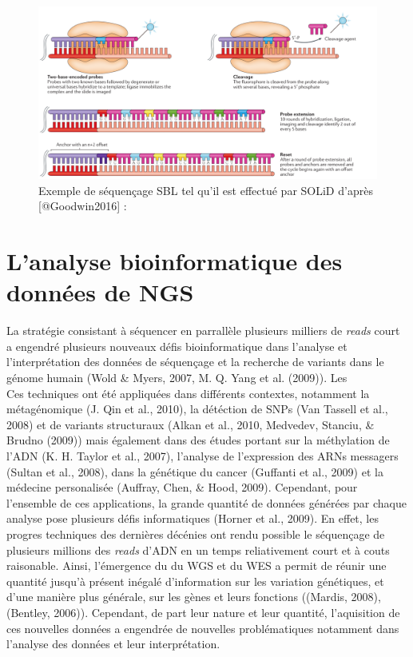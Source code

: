 \documentclass[12pt,twoside]{reedthesis}
\theoremstyle{definition}
\theoremstyle{definition}
\theoremstyle{remark}
\begin{document}
  \begin{figure}
  
  {\centering \includegraphics[scale=.26]{figure/SBL_seq_solid} 
  
  }
  
  \caption[Exemple de séquençage SBL tel qu'il est effectué par SOLiD]{Exemple de séquençage SBL tel qu'il est effectué par SOLiD d'après [@Goodwin2016] : }\label{fig:sblSeq}
  \end{figure}
  
  \section{L'analyse bioinformatique des données de
  NGS}\label{lanalyse-bioinformatique-des-donnees-de-ngs}
  
  La stratégie consistant à séquencer en parrallèle plusieurs milliers de
  \emph{reads} court a engendré plusieurs nouveaux défis bioinformatique
  dans l'analyse et l'interprétation des données de séquençage et la
  recherche de variants dans le génome humain (Wold \& Myers, 2007, M. Q.
  Yang et al. (2009)). Les\\
  Ces techniques ont été appliquées dans différents contextes, notamment
  la métagénomique (J. Qin et al., 2010), la détéction de SNPs (Van
  Tassell et al., 2008) et de variants structuraux (Alkan et al., 2010,
  Medvedev, Stanciu, \& Brudno (2009)) mais également dans des études
  portant sur la méthylation de l'ADN (K. H. Taylor et al., 2007),
  l'analyse de l'expression des ARNs messagers (Sultan et al., 2008), dans
  la génétique du cancer (Guffanti et al., 2009) et la médecine
  personalisée (Auffray, Chen, \& Hood, 2009). Cependant, pour l'ensemble
  de ces applications, la grande quantité de données générées par chaque
  analyse pose plusieurs défis informatiques (Horner et al., 2009). En
  effet, les progres techniques des dernières décénies ont rendu possible
  le séquençage de plusieurs millions des \emph{reads} d'ADN en un temps
  reliativement court et à couts raisonable. Ainsi, l'émergence du du WGS
  et du WES a permit de réunir une quantité jusqu'à présent inégalé
  d'information sur les variation génétiques, et d'une manière plus
  générale, sur les gènes et leurs fonctions ((Mardis, 2008), (Bentley,
  2006)). Cependant, de part leur nature et leur quantité, l'aquisition de
  ces nouvelles données a engendrée de nouvelles problématiques notamment
  dans l'analyse des données et leur interprétation.
  
\end{document}
